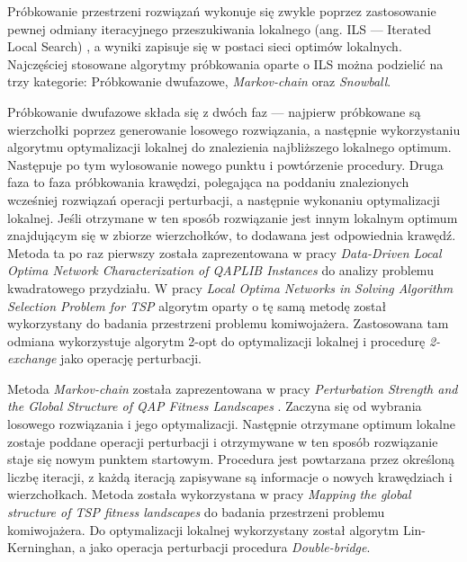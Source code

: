 Próbkowanie przestrzeni rozwiązań wykonuje się zwykle poprzez zastosowanie pewnej odmiany iteracyjnego przeszukiwania lokalnego
(ang. ILS --- Iterated Local Search) \cite{DBLP:journals/corr/OchoaVDT14},
a wyniki zapisuje się w postaci sieci optimów lokalnych.
Najczęściej stosowane algorytmy próbkowania oparte o ILS można podzielić na trzy kategorie:
Próbkowanie dwufazowe, \textit{Markov-chain} oraz \textit{Snowball}.

Próbkowanie dwufazowe składa się z dwóch faz --- najpierw próbkowane są wierzchołki poprzez  generowanie
losowego rozwiązania, a następnie wykorzystaniu algorytmu optymalizacji lokalnej do znalezienia najbliższego
lokalnego optimum. Następuje po tym wylosowanie nowego punktu i powtórzenie procedury.
Druga faza to faza próbkowania krawędzi, polegająca na poddaniu znalezionych wcześniej rozwiązań operacji perturbacji, a następnie wykonaniu optymalizacji
lokalnej. Jeśli otrzymane w ten sposób rozwiązanie jest innym lokalnym optimum znajdującym się w zbiorze wierzchołków, to dodawana jest odpowiednia krawędź.
Metoda ta po raz pierwszy została zaprezentowana w pracy \textit{Data-Driven Local Optima Network Characterization of QAPLIB Instances} \cite{10.1145/2576768.2598275}
do analizy problemu kwadratowego przydziału.
W pracy \textit{Local Optima Networks in Solving Algorithm Selection Problem for TSP} \cite{DBLP:conf/depcos/BozejkoGNAB18}
algorytm oparty o tę samą metodę został wykorzystany do badania przestrzeni problemu komiwojażera.
Zastosowana tam odmiana wykorzystuje algorytm 2-opt do optymalizacji lokalnej i procedurę \textit{2-exchange} jako operację perturbacji.

Metoda \textit{Markov-chain} została zaprezentowana w pracy \textit{Perturbation Strength and the Global Structure of QAP Fitness Landscapes} \cite{markovchain}.
Zaczyna się od wybrania losowego rozwiązania i jego optymalizacji. Następnie otrzymane optimum lokalne zostaje poddane operacji perturbacji
i otrzymywane w ten sposób rozwiązanie staje się nowym punktem startowym. Procedura jest powtarzana przez określoną liczbę iteracji, z każdą iteracją
zapisywane są informacje o nowych krawędziach i wierzchołkach.
Metoda została wykorzystana w pracy \textit{Mapping the global structure of TSP fitness landscapes} \cite{DBLP:journals/heuristics/OchoaV18} do badania przestrzeni problemu komiwojażera.
Do optymalizacji lokalnej wykorzystany został algorytm Lin-Kerninghan, a jako operacja perturbacji procedura \textit{Double-bridge}.


